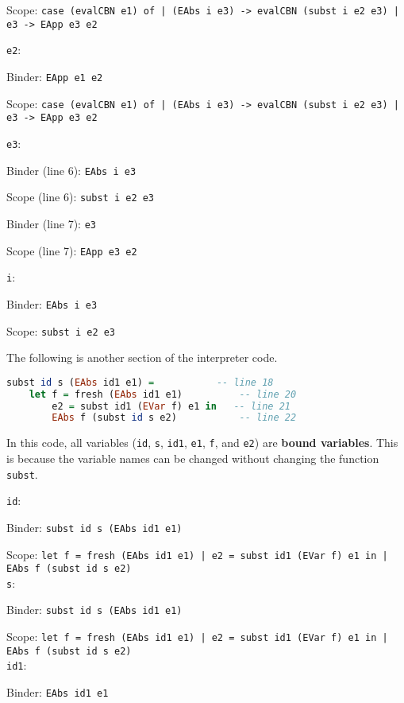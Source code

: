 \documentclass{article}
\theoremstyle{theorem}
\theoremstyle{definition}
\theoremstyle{remark}
\begin{document}
Scope: \texttt{case (evalCBN e1) of
| (EAbs i e3) -> evalCBN (subst i e2 e3)
| e3 -> EApp e3 e2}

\noindent \texttt{e2}:

Binder: \texttt{EApp e1 e2}

Scope: \texttt{case (evalCBN e1) of
| (EAbs i e3) -> evalCBN (subst i e2 e3)
| e3 -> EApp e3 e2}

\noindent \texttt{e3}:

Binder (line 6): \texttt{EAbs i e3}

Scope (line 6): \texttt{subst i e2 e3}

Binder (line 7): \texttt{e3}

Scope (line 7): \texttt{EApp e3 e2}

\noindent \texttt{i}:

Binder: \texttt{EAbs i e3}

Scope: \texttt{subst i e2 e3}

\newpage

The following is another section of the interpreter code.
\begin{lstlisting}[language=Haskell]
    subst id s (EAbs id1 e1) =           -- line 18
    let f = fresh (EAbs id1 e1)          -- line 20
        e2 = subst id1 (EVar f) e1 in   -- line 21
        EAbs f (subst id s e2)           -- line 22
\end{lstlisting}

\noindent In this code, all variables (\texttt{id}, \texttt{s}, \texttt{id1}, \texttt{e1}, \texttt{f}, and \texttt{e2}) are \textbf{bound variables}. This is because the variable names can be changed without changing the function \texttt{subst}.\newline

\noindent \texttt{id}:

Binder: \texttt{subst id s (EAbs id1 e1)}

Scope: \texttt{let f = fresh (EAbs id1 e1)
| e2 = subst id1 (EVar f) e1 in
| EAbs f (subst id s e2)}\\

\noindent \texttt{s}:

Binder: \texttt{subst id s (EAbs id1 e1)}

Scope: \texttt{let f = fresh (EAbs id1 e1)
| e2 = subst id1 (EVar f) e1 in
| EAbs f (subst id s e2)}\\

\noindent \texttt{id1}:

Binder: \texttt{EAbs id1 e1}
\end{document}
